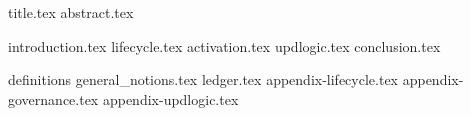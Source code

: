 \documentclass{llncs}
\begin{document}
{title.tex}
{abstract.tex}

{introduction.tex}
{lifecycle.tex}
{activation.tex}
{updlogic.tex}
{conclusion.tex}

\appendix
{definitions}
{general_notions.tex}
{ledger.tex}
{appendix-lifecycle.tex}
{appendix-governance.tex}
{appendix-updlogic.tex}


\end{document}
